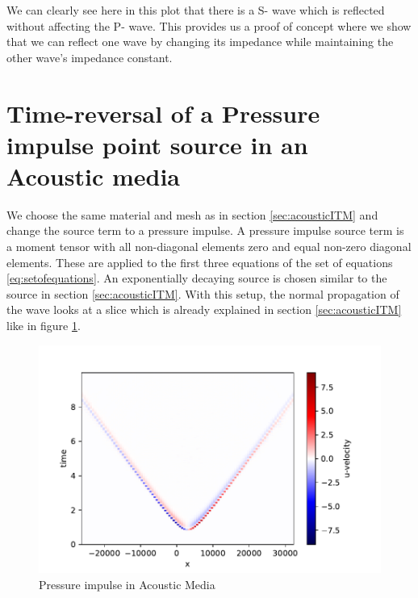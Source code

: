 We can clearly see here in this plot that there is a S- wave which is reflected without affecting the P- wave. 
This provides us a proof of concept where we show that we can reflect one wave by changing its impedance while maintaining the other wave's impedance constant. \\

\section{Time-reversal of a Pressure impulse point source in an Acoustic media}
We choose the same material and mesh as in section \ref{sec:acousticITM} and change the source term to a pressure impulse. A pressure impulse source term is a moment tensor
with all non-diagonal elements zero and equal non-zero diagonal elements. These are applied to the first three equations of the set of equations \ref{eq:setofequations}. 
An exponentially decaying source is chosen similar to the source in section \ref{sec:acousticITM}. With this setup, the normal propagation of the wave looks at a slice which is already explained in section \ref{sec:acousticITM}
like in figure \ref{fig:space-timeplot-pressurenoITM}.

\begin{figure}
    \centering
    \includegraphics[width=0.75\linewidth]{figures/pressureimpulsewave-noITM.pdf}
    \caption{Pressure impulse in Acoustic Media}
    \label{fig:space-timeplot-pressurenoITM}
\end{figure}

